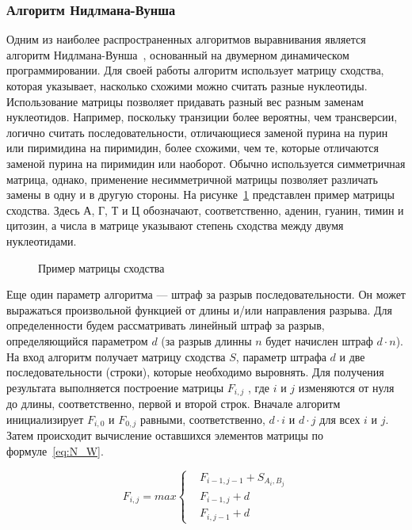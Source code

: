 \subsubsection[Алгоритм Нидлмана-Вунша]{\large Алгоритм Нидлмана-Вунша}
\hspace{\parindent} Одним из наиболее распространенных алгоритмов выравнивания является алгоритм Нидлмана-Вунша~\cite{NWalgo}, основанный на двумерном динамическом программировании. Для своей работы алгоритм использует матрицу сходства, которая указывает, насколько схожими можно считать разные нуклеотиды. Использование матрицы позволяет придавать разный вес разным заменам нуклеотидов. Например, поскольку транзиции более вероятны, чем трансверсии, логично считать последовательности, отличающиеся заменой пурина на пурин или пиримидина на пиримидин, более схожими, чем те, которые отличаются заменой пурина на пиримидин или наоборот. Обычно используется симметричная матрица, однако, применение несимметричной матрицы позволяет различать замены в одну и в другую стороны. На рисунке~\ref{ris:ReplaceMatrix} представлен пример матрицы сходства. Здесь А, Г, Т и Ц обозначают, соответственно, аденин, гуанин, тимин и цитозин, а числа в матрице указывают степень сходства между двумя нуклеотидами.

\begin{figure}[h]
	\caption{Пример матрицы сходства}
	\label{ris:ReplaceMatrix}
\end{figure}

\indent Еще один параметр алгоритма --- штраф за разрыв последовательности. Он может выражаться произвольной функцией от длины и/или направления разрыва. Для определенности будем рассматривать линейный штраф за разрыв, определяющийся параметром $d$ (за разрыв длинны $n$ будет начислен штраф $d \cdot n$).\\
\indent На вход алгоритм получает матрицу сходства $S$, параметр штрафа $d$ и две последовательности (строки), которые необходимо выровнять. Для получения результата выполняется построение матрицы $F_{i,j}$ , где $i$ и $j$ изменяются от нуля до длины, соответственно, первой и второй строк. Вначале алгоритм инициализирует $F_{i,0}$ и $F_{0,j}$ равными, соответственно, $d \cdot i$ и $d \cdot j$ для всех $i$ и $j$. Затем происходит вычисление оставшихся элементов матрицы по формуле~\ref{eq:N_W}.

\begin{equation}\label{eq:N_W}
F_{i,j} = max\left\{
	\begin{aligned}
		& F_{i-1,j-1} + S_{A_i,B_j}\\
		& F_{i-1,j} + d\\
		& F_{i,j-1} + d
	\end{aligned}
	\right.
\end{equation}

